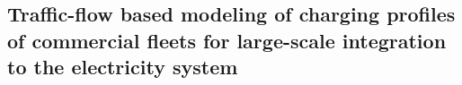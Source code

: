 \color{black}
        \subsection{Traffic-flow based modeling of charging profiles of commercial fleets for large-scale integration to the electricity system}

